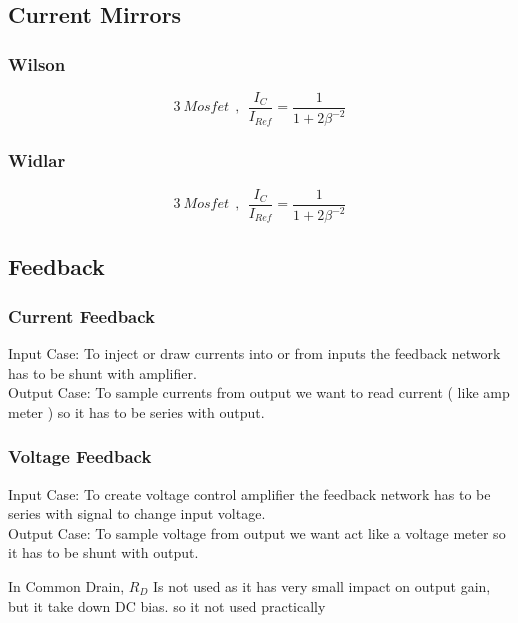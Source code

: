 \subsection{Current Mirrors}
\subsubsection{Wilson}
$$ 3~Mosfet ~~ , ~~ \frac{I_C}{I_{Ref}} = \frac{1}{1 + 2 \beta ^ {-2}} $$
\par
\subsubsection{Widlar}
$$ 3~Mosfet ~~ , ~~ \frac{I_C}{I_{Ref}} = \frac{1}{1 + 2 \beta ^ {-2}} $$
\par
\subsection{Feedback}
\subsubsection{Current Feedback}
Input Case: To inject or draw currents into or from inputs the feedback network has to be shunt with amplifier.\\
Output Case: To sample currents from output we want to read current ( like amp meter ) so it has to be series with output.
\subsubsection{Voltage Feedback}
Input Case: To create voltage control amplifier the feedback network has to be series with signal to change input voltage.\\
Output Case: To sample voltage from output we want act like a voltage meter so it has to be shunt with output.
\par
\setlength{\parindent}{0.5cm} %
In Common Drain, $R_D$ Is not used as it has very small impact on output gain, but it take down DC bias. so it not used practically
\lipsum[2]
\setlength{\parindent}{0.0cm} 
